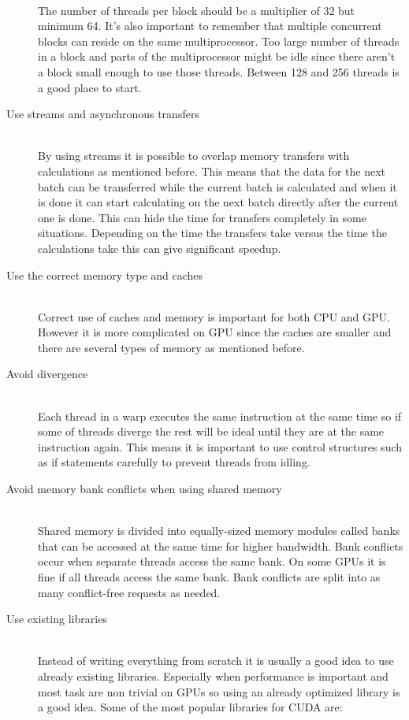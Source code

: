 \documentclass[10pt,a4paper]{report}
\begin{document}
\begin{description}
  \\  
  The number of threads per block should be a multiplier of 32 but minimum 64. It's also important to remember that multiple concurrent blocks can reside on the same multiprocessor. Too large number of threads in a block and parts of the multiprocessor might be idle since there aren't a block small enough to use those threads. Between 128 and 256 threads is a good place to start.\cite{cuda_best_practice}
  \item[Use streams and asynchronous transfers] \hfill \\
  By using streams it is possible to overlap memory transfers with calculations as mentioned before. This means that the data for the next batch can be transferred while the current batch is calculated and when it is done it can start calculating on the next batch directly after the current one is done. This can hide the time for transfers completely in some situations. Depending on the time the transfers take versus the time the calculations take this can give significant speedup.\cite{cuda, overlap_transfers_cuda, kepler_tuning_guide}
  \item[Use the correct memory type and caches] \hfill \\
  Correct use of caches and memory is important for both CPU\cite{drepper2007cpumemory} and GPU. However it is more complicated on GPU since the caches are smaller and there are several types of memory as mentioned before\cite{cuda, cuda_best_practice}.
  \item[Avoid divergence] \hfill \\
  Each thread in a warp executes the same instruction at the same time so if some of threads diverge the rest will be ideal until they are at the same instruction again. This means it is important to use control structures such as if statements carefully to prevent threads from idling.\cite{cuda, cuda_best_practice}
  \item[Avoid memory bank conflicts when using shared memory] \hfill \\
  Shared memory is divided into equally-sized memory modules called banks that can be accessed at the same time for higher bandwidth. Bank conflicts occur when separate threads access the same bank. On some GPUs it is fine if all threads access the same bank. Bank conflicts are split into as many conflict-free requests as needed.\cite{cuda, cuda_best_practice}
  \item[Use existing libraries] \hfill \\
  Instead of writing everything from scratch it is usually a good idea to use already existing libraries. Especially when performance is important and most task are non trivial on GPUs so using an already optimized library is a good idea. Some of the most popular libraries for CUDA are:

\end{description}
\end{document}
